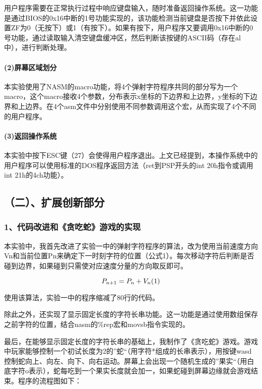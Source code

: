 \documentclass[ctexart]{article}
\let\oldparagraph\paragraph
\renewcommand{\paragraph}[1]{\oldparagraph{#1}\mbox{}}
\begin{document}
用户程序需要在正常执行过程中响应键盘输入，随时准备返回操作系统。这一功能是通过BIOS的0x16中断的1号功能实现的，该功能检测当前键盘是否按下并依此设置ZF为0（无按下）或1（有按下）。如果有按下，用户程序又要调用0x16中断的0号功能，通过读取输入清空键盘缓冲区，然后判断该按键的ASCII码（存在al中），进行判断处理。

\hypertarget{header-n446}{%
\paragraph{(2)屏幕区域划分}\label{header-n446}}

本实验使用了NASM的macro功能，将4个弹射字符程序共同的部分写为一个macro，这个macro接收4个参数，分布表示x坐标的下边界和上边界，y坐标的下边界和上边界。在4个asm文件中分别使用不同参数调用这个宏，从而实现了4个不同的用户程序。

\hypertarget{header-n459}{%
\paragraph{(3)返回操作系统}\label{header-n459}}

本实验中按下ESC键（27）会使得用户程序退出。上文已经提到，本操作系统中的用户程序可以使用标准的DOS程序返回方法（ret到PSP开头的int
20h指令或调用int 21h的4ch功能）。

\hypertarget{header-n434}{%
\subsection{（二）、扩展创新部分}\label{header-n434}}

\hypertarget{header-n492}{%
\subsubsection{1、代码改进和《贪吃蛇》游戏的实现}\label{header-n492}}

本实验中，我首先改进了实验一中的弹射字符程序的算法，改为使用当前速度方向Vn和当前位置Pn来确定下一时刻字符的位置（公式1）。每次移动字符后判断是否碰到边界，如果碰到只需使对应速度分量的方向取反即可。

\[P_{n+1} = P_{n} + V_n\space\space\space\space\space\space\space\space\space\space(1)\]

使用该算法，实验一中的程序缩减了80行的代码。

除此之外，还实现了显示固定长度的字符长串功能。这一功能是通过使用数组保存之前字符的位置，结合nasm的\%rep宏和movsb指令实现的。

最后，在能够显示固定长度的字符长串的基础上，我制作了《贪吃蛇》游戏。游戏中玩家能够控制一个初试长度为2的''蛇``（用字符*组成的长串表示），用按键wasd控制蛇向上、向左、向下、向右运动。屏幕上会出现一个随机生成的''果实``（用白底字符o表示），蛇每吃到一个果实长度就会加一，如果蛇碰到屏幕边缘就会游戏结束。程序的流程图如下：
\end{document}
